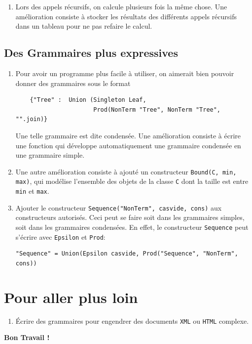 \documentclass[11pt]{article}
\newcounter{asuivre}
\newenvironment{asks}{\begin{enumerate}\setcounter{enumi}{\theasuivre}}%
                       {\setcounter{asuivre}{\theenumi}\end{enumerate}}
\begin{document}
\begin{asks}
\item Lors des appels récursifs, on calcule plusieurs fois la même chose. Une
  amélioration consiste à stocker les résultats des différents appels
  récursifs dans un tableau pour ne pas refaire le calcul.
\end{asks}

\subsection{Des Grammaires plus expressives}

\begin{asks}
\item Pour avoir un programme plus facile à utiliser, on aimerait bien pouvoir
  donner des grammaires sous le format
\begin{verbatim}
    {"Tree" :  Union (Singleton Leaf,
                      Prod(NonTerm "Tree", NonTerm "Tree", "".join)}
\end{verbatim}
  Une telle grammaire est dite condensée. Une amélioration consiste à écrire
  une fonction qui développe automatiquement une grammaire
  condensée en une grammaire simple.
\item Une autre amélioration consiste à ajouté un constructeur
  \texttt{Bound(C, min, max)}, qui modélise l'ensemble des objets de la classe
  \texttt{C} dont la taille est entre \texttt{min} et \texttt{max}.
\item Ajouter le constructeur \texttt{Sequence("NonTerm", casvide, cons)} aux
  constructeurs autorisés. Ceci peut se faire soit dans les grammaires
  simples, soit dans les grammaires condensées.  En effet, le constructeur
  \texttt{Sequence} peut s'écrire avec \texttt{Epsilon} et \texttt{Prod}:
\begin{verbatim}
"Sequence" = Union(Epsilon casvide, Prod("Sequence", "NonTerm", cons))
\end{verbatim}
\end{asks}

\section{Pour aller plus loin}

\begin{asks}
\item Écrire des grammaires pour engendrer des documents \texttt{XML} ou
  \texttt{HTML} complexe.
\end{asks}
\bigskip
\bigskip
\bigskip
\hskip10cm{\Large\bf Bon Travail !}
\end{document}
